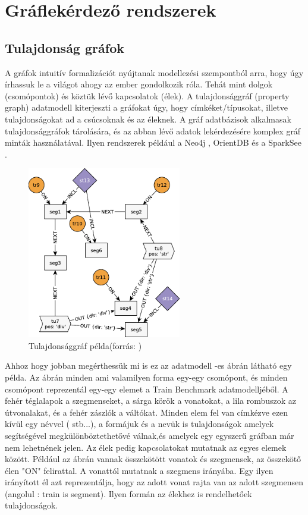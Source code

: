 \section{Gráflekérdező rendszerek}
\subsection{Tulajdonság gráfok}

A gráfok intuitív formalizációt nyújtanak modellezési szempontból arra, hogy úgy írhassuk le a világot ahogy az ember gondolkozik róla. Tehát mint dolgok (csomópontok) és köztük lévő kapcsolatok (élek)\cite{marton2017model}. A tulajdonsággráf (property graph) adatmodell kiterjeszti a gráfokat úgy, hogy címkéket/típusokat, illetve tulajdonságokat ad a csúcsoknak és az éleknek. A gráf adatbázisok  alkalmasak tulajdonsággráfok tárolására, és az abban lévő adatok lekérdezésére komplex gráf minták használatával. Ilyen rendszerek például a Neo4j \cite{neo4j}, OrientDB \cite{orientdb} és a  SparkSee \cite{sparksee}.

\begin{figure}
	\centering
	\includegraphics[width=0.6\textwidth]{figures/tulajdonsággráfpélda}
	\caption{Tulajdonsággráf példa(forrás: \cite{marton2017model})}
	\label{fig:tulajdonsággráfpélda}
\end{figure}

Ahhoz hogy jobban megérthessük mi is ez az adatmodell  -es ábrán látható egy példa. Az ábrán minden ami valamilyen forma egy-egy csomópont, és minden csomópont reprezentál egy-egy elemet a Train Benchmark adatmodelljéből. A fehér téglalapok a szegmenseket,  a sárga körök a vonatokat, a lila rombuszok az útvonalakat, és a fehér zászlók a váltókat. Minden elem fel van címkézve ezen kívül egy névvel ( stb...), a formájuk és a nevük is tulajdonságok amelyek segítségével megkülönböztethetővé válnak,és amelyek egy egyszerű gráfban már nem lehetnének jelen. Az élek pedig kapcsolatokat mutatnak az egyes elemek között. Például az ábrán vannak összekötött vonatok és szegmensek, az összekötő élen "ON" felirattal. A vonattól mutatnak a szegmens irányába. Egy ilyen irányított él azt reprezentálja, hogy az adott vonat rajta van az adott szegmensen (angolul : train is  segment). Ilyen formán az élekhez is rendelhetőek tulajdonságok. 


